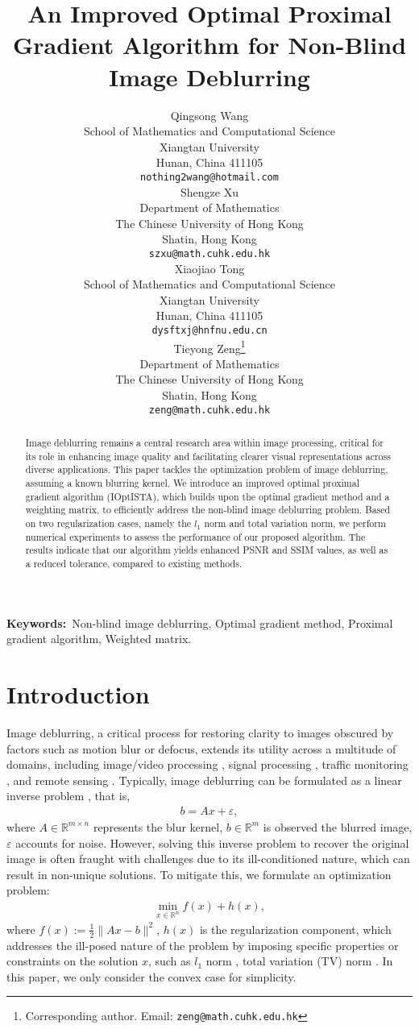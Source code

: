 \documentclass{article}
\title{An Improved Optimal Proximal Gradient Algorithm for Non-Blind Image Deblurring}
\author{
 Qingsong Wang \\
  School of Mathematics and Computational Science\\
  Xiangtan University\\
  Hunan, China 411105 \\
  \texttt{nothing2wang@hotmail.com} \\
   \And
 Shengze Xu \\
  Department of Mathematics\\
  The Chinese University of Hong Kong\\
  Shatin, Hong Kong \\
  \texttt{szxu@math.cuhk.edu.hk} \\
  \And
 Xiaojiao Tong \\
  School of Mathematics and Computational Science\\
  Xiangtan University\\
  Hunan, China 411105 \\
  \texttt{dysftxj@hnfnu.edu.cn} \\
     \And
 Tieyong Zeng\thanks{Corresponding author. Email: \texttt{zeng@math.cuhk.edu.hk}} \\
  Department of Mathematics\\
  The Chinese University of Hong Kong\\
  Shatin, Hong Kong \\
  \texttt{zeng@math.cuhk.edu.hk} \\
}
\def\keywords{\vspace{.5em}
	{\bf{Keywords}:\,\relax%
}}
\begin{document}
\maketitle
\begin{abstract}
Image deblurring remains a central research area within image processing, critical for its role in enhancing image quality and facilitating clearer visual representations across diverse applications. This paper tackles the optimization problem of image deblurring, assuming a known blurring kernel. We introduce an improved optimal proximal gradient algorithm (IOptISTA), which builds upon the optimal gradient method and a weighting matrix, to efficiently address the non-blind image deblurring problem. Based on two regularization cases, namely the $l_1$ norm and total variation norm, we perform numerical experiments to assess the performance of our proposed algorithm. The results indicate that our algorithm yields enhanced PSNR and SSIM values, as well as a reduced tolerance, compared to existing methods. %
\end{abstract}


\keywords{Non-blind image deblurring, Optimal gradient method, Proximal gradient algorithm, Weighted matrix. }


\section{Introduction}
Image deblurring, a critical process for restoring clarity to images obscured by factors such as motion blur or defocus, extends its utility across a multitude of domains, including image/video processing \cite{ZhangLGWL24, ZhangQZ24, LiSXZ22}, signal processing \cite{ZhangWZZL20, TangXCZ18, WangJJGY24, EqtedaeiA24}, traffic monitoring \cite{AliyanB12, YangFZWYY23, WangZZLZ24}, and remote sensing \cite{ZhangZLHC22, LiLZGW24, LiuYLJCP23}. Typically, image deblurring can be formulated as a linear inverse problem \cite{BenningB18, ArridgeMOS19}, that is,
\begin{eqnarray}
	b=Ax+\varepsilon, \label{linear-equation}
\end{eqnarray}
where $A\in\mathbb{R}^{m\times n}$ represents the blur kernel, $b\in\mathbb{R}^{m}$ is observed the blurred image, $\varepsilon$ accounts for noise. However, solving this inverse problem to recover the original image is often fraught with challenges due to its ill-conditioned nature, which can result in non-unique solutions. To mitigate this, we formulate an optimization problem:
\begin{eqnarray}
	\min_{x\in\mathbb{R}^{n}}  f(x)+h(x), \label{target-function}
\end{eqnarray}
where $f(x):=\frac{1}{2}\|Ax-b\|^{2}$, $h(x)$ is the regularization component, which addresses the ill-posed nature of the problem by imposing specific properties or constraints on the solution $x$, such as $l_{1}$ norm \cite{Tibshirani96}, total variation (TV) norm \cite{RudinOF92}. In this paper, we only consider the convex case for simplicity.
\end{document}
